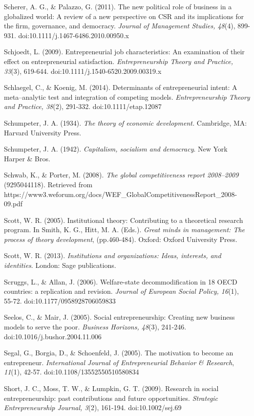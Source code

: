 \documentclass{article}
\begin{document}
Scherer, A. G., \& Palazzo, G. (2011). The new political role of business in a globalized world: A review of a new perspective on CSR and its implications for the firm, governance, and democracy. \emph{Journal of Management Studies, 48}(4), 899-931. doi:10.1111/j.1467-6486.2010.00950.x

Schjoedt, L. (2009). Entrepreneurial job characteristics: An examination of their effect on entrepreneurial satisfaction. \emph{Entrepreneurship Theory and Practice, 33}(3), 619-644. doi:10.1111/j.1540-6520.2009.00319.x

Schlaegel, C., \& Koenig, M. (2014). Determinants of entrepreneurial intent: A meta--analytic test and integration of competing models. \emph{Entrepreneurship Theory and Practice, 38}(2), 291-332. doi:10.1111/etap.12087

Schumpeter, J. A. (1934). \emph{The theory of economic development. }Cambridge, MA: Harvard University Press.

Schumpeter, J. A. (1942). \emph{Capitalism, socialism and democracy}. New York Harper \& Bros.

Schwab, K., \& Porter, M. (2008). \emph{The global competitiveness report 2008--2009} (9295044118). Retrieved from https://www3.weforum.org/docs/WEF\_GlobalCompetitivenessReport\_2008-09.pdf

Scott, W. R. (2005). Institutional theory: Contributing to a theoretical research program. In Smith, K. G., Hitt, M. A. (Eds.). \emph{Great minds in management: The process of theory development}, (pp.460-484). Oxford: Oxford University Press. 

Scott, W. R. (2013). \emph{Institutions and organizations: Ideas, interests, and identities}. London: Sage publications.

Scruggs, L., \& Allan, J. (2006). Welfare-state decommodification in 18 OECD countries: a replication and revision. \emph{Journal of European Social Policy, 16}(1), 55-72. doi:10.1177/0958928706059833

Seelos, C., \& Mair, J. (2005). Social entrepreneurship: Creating new business models to serve the poor. \emph{Business Horizons, 48}(3), 241-246. doi:10.1016/j.bushor.2004.11.006

Segal, G., Borgia, D., \& Schoenfeld, J. (2005). The motivation to become an entrepreneur. \emph{International Journal of Entrepreneurial }\emph{Behavior}\emph{ \& Research}, \emph{11}(1), 42-57. doi:10.1108/13552550510580834

Short, J. C., Moss, T. W., \& Lumpkin, G. T. (2009). Research in social entrepreneurship: past contributions and future opportunities. \emph{Strategic Entrepreneurship Journal, 3}(2), 161-194. doi:10.1002/sej.69
\end{document}
